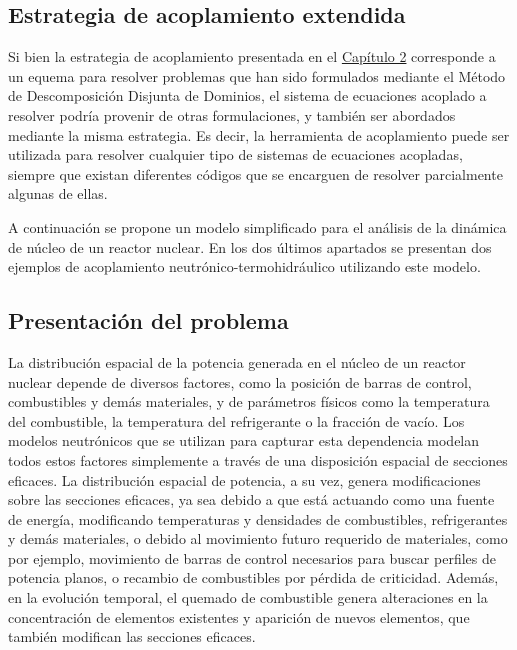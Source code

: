 \subsection*{Estrategia de acoplamiento extendida}
\label{3:strategy-extended}

Si bien la estrategia de acoplamiento presentada en el \hyperlink{chapter.2}{Capítulo 2}
corresponde a un equema para resolver problemas que han sido formulados mediante el Método de Descomposición Disjunta de Dominios,
el sistema de ecuaciones acoplado a resolver podría provenir de otras formulaciones,
y también ser abordados mediante la misma estrategia.
Es decir, la herramienta de acoplamiento puede ser utilizada para resolver cualquier tipo de sistemas de ecuaciones acopladas,
siempre que existan diferentes códigos que se encarguen de resolver parcialmente algunas de ellas.

A continuación se propone un modelo simplificado para el análisis de la dinámica de núcleo de un reactor nuclear.
En los dos últimos apartados se presentan dos ejemplos de acoplamiento neutrónico-termohidráulico utilizando este modelo.

\subsection*{Presentación del problema}
\label{3:neut-th}

La distribución espacial de la potencia generada en el núcleo de un reactor nuclear
depende de diversos factores, como la posición de barras de control, combustibles y demás materiales,
y de parámetros físicos como la temperatura del combustible, la temperatura del refrigerante o la fracción de vacío.
Los modelos neutrónicos que se utilizan para capturar esta dependencia modelan todos estos factores simplemente a través de una disposición espacial de secciones eficaces.
La distribución espacial de potencia, a su vez, genera modificaciones sobre las secciones eficaces,
ya sea debido a que está actuando como una fuente de energía, modificando temperaturas y densidades de combustibles, refrigerantes y demás materiales,
o debido al movimiento futuro requerido de materiales,
como por ejemplo, movimiento de barras de control necesarios para buscar perfiles de potencia planos, o recambio de combustibles por pérdida de criticidad.
Además, en la evolución temporal, el quemado de combustible genera alteraciones en la concentración de elementos existentes y aparición de nuevos elementos,
que también modifican las secciones eficaces.

